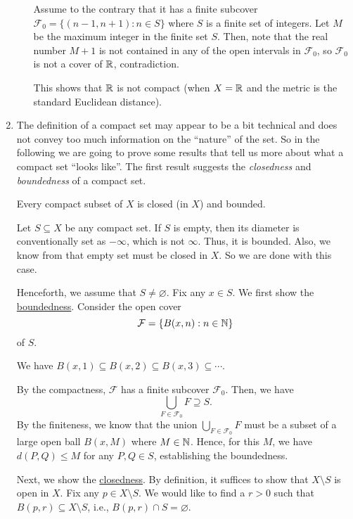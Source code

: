 \begin{enumerate}
\begin{itemize}
\begin{pf}
Assume to the contrary that it has a finite subcover
\(\mathcal{F}_0=\{(n-1,n+1):n\in S\}\) where \(S\) is a finite set of integers.
Let \(M\) be the maximum integer in the finite set \(S\). Then, note that the
real number \(M+1\) is not contained in any of the open intervals in
\(\mathcal{F}_0\), so \(\mathcal{F}_0\) is not a cover of \(\mathbb{R}\),
contradiction.
\end{pf}

This shows that \(\mathbb{R}\) is not compact (when \(X=\mathbb{R}\) and the metric is the
standard Euclidean distance).
\end{itemize}

\item The definition of a compact set may appear to be a bit technical and does
not convey too much information on the ``nature'' of the set. So in the
following we are going to prove some results that tell us more about what a
compact set ``looks like''. The first result suggests the \emph{closedness} and
\emph{boundedness} of a compact set.

\begin{theorem}
\label{thm:compact-imp-closed-bounded}
Every compact subset of \(X\) is closed (in \(X\)) and bounded.
\end{theorem}
\begin{pf}
Let \(S\subseteq X\) be any compact set. If \(S\) is empty, then its diameter
is conventionally set as \(-\infty\), which is not \(\infty\). Thus, it is
bounded. Also, we know from  that empty set must
be closed in \(X\). So we are done with this case.

Henceforth, we assume that \(S\ne\varnothing\). Fix any \(x\in S\). We first
show the \underline{boundedness}. Consider the open cover
\[
\mathcal{F}=\{B(x,n):n\in\mathbb{N}\}
\]
of \(S\). \begin{note}
We have \(B(x,1)\subseteq B(x,2)\subseteq B(x,3)\subseteq \dotsb\).
\end{note}
By the compactness, \(\mathcal{F}\) has a finite subcover \(\mathcal{F}_0\).
Then, we have
\[
\bigcup_{F\in\mathcal{F}_0}F\supseteq S.
\]
By the finiteness, we know that the union \(\displaystyle
\bigcup_{F\in\mathcal{F}_0}F\) must be a subset of a large open ball
\(B(x,M)\) where \(M\in\mathbb{N}\). Hence, for this \(M\), we have \(d(P,Q)\le
M\) for any \(P,Q\in S\), establishing the boundedness.

Next, we show the \underline{closedness}. By definition, it suffices to show
that \(X\setminus S\) is open in \(X\). Fix any \(p\in X\setminus S\). We would
like to find a \(r>0\) such that \(B(p,r)\subseteq X\setminus S\), i.e.,
\(B(p,r)\cap S=\varnothing\).


\end{pf}
\end{enumerate}
